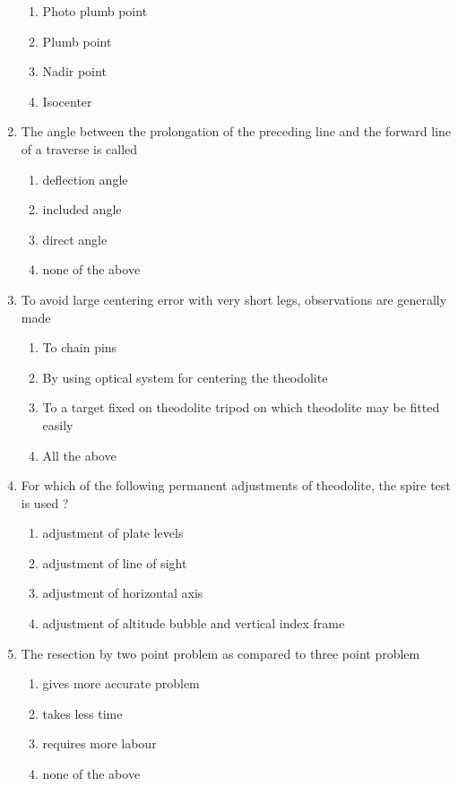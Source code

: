 \documentclass[11pt,a4paper]{article}
\begin{document}
\begin{enumerate}
\begin{enumerate}[label=\Alph*.]
\item{Photo plumb point}
\item{Plumb point}
\item{Nadir point}
\item{Isocenter}
\end{enumerate}
\item{The angle between the prolongation of the preceding line and the forward line of a traverse is called}
\begin{enumerate}[label=\Alph*.]
\item{deflection angle}
\item{included angle}
\item{direct angle}
\item{none of the above}
\end{enumerate}
\item{To avoid large centering error with very short legs, observations are generally made}
\begin{enumerate}[label=\Alph*.]
\item{To chain pins}
\item{By using optical system for centering the theodolite}
\item{To a target fixed on theodolite tripod on which theodolite may be fitted easily}
\item{All the above}
\end{enumerate}
\item{For which of the following permanent adjustments of theodolite, the spire test is used ?}
\begin{enumerate}[label=\Alph*.]
\item{adjustment of plate levels}
\item{adjustment of line of sight}
\item{adjustment of horizontal axis}
\item{adjustment of altitude bubble and vertical index frame}
\end{enumerate}
\item{The resection by two point problem as compared to three point problem}
\begin{enumerate}[label=\Alph*.]
\item{gives more accurate problem}
\item{takes less time}
\item{requires more labour}
\item{none of the above}
\end{enumerate}

\end{enumerate}
\end{document}
